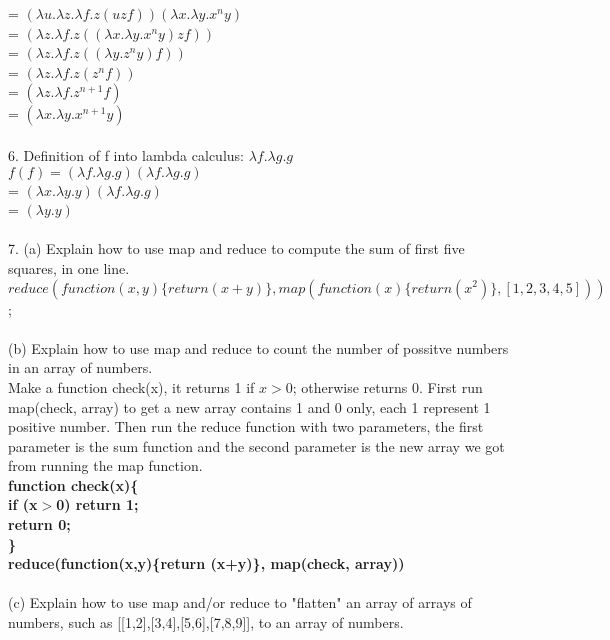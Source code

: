 \documentclass[12pt]{article}
\begin{document}
= $(\lambda u.\lambda z.\lambda f.z(uzf))(\lambda x.\lambda y.x^{n}y)$\\
= $(\lambda z.\lambda f.z((\lambda x.\lambda y.x^{n}y)zf))$\\
= $(\lambda z.\lambda f.z((\lambda y.z^{n}y)f))$\\
= $(\lambda z.\lambda f.z(z^{n}f))$\\
= $(\lambda z.\lambda f.z^{n+1}f)$\\
= $(\lambda x.\lambda y.x^{n+1}y)$\\
\vspace{1mm}\\
6. Definition of f into lambda calculus: 
\indent $\lambda f.\lambda g.g$\\
$f(f) = (\lambda f.\lambda g.g)(\lambda f.\lambda g.g)$\\
= $(\lambda x.\lambda y.y)(\lambda f.\lambda g.g)$\\
= $(\lambda y.y)$\\
\vspace{1mm}\\
7. (a) Explain how to use map and reduce to compute the sum of first five squares, in one line.\\
$reduce(function(x,y)\{return (x+y)\}, map(function(x)\{return  (x^{2})\}, [1,2,3,4,5]))$;\\
\vspace{1mm}\\
(b) Explain how to use map and reduce to count the number of possitve numbers in an array of numbers.\\
Make a function check(x), it returns 1 if $x > 0$; otherwise returns 0. First run map(check, array) to get a new array contains 1 and 0 only, each 1 represent 1 positive number. Then run the reduce function with two parameters, the first parameter is the sum function and the second parameter is the new array we got from running the map function.\\
\textbf{ function check(x)\{\\
\indent	if (x$>$0) return 1;\\
\indent	return 0;\\
\}\\
reduce(function(x,y)\{return (x+y)\}, map(check, array))}\\
\vspace{1mm}\\
(c) Explain how to use map and/or reduce to "flatten" an array of arrays of numbers, such as [[1,2],[3,4],[5,6],[7,8,9]], to an array of numbers.\\
\end{document}
